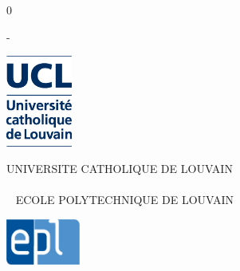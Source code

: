\documentclass[11pt,a4paper,oldfontcommands]{memoir}
\newcommand\draft{0}
\begin{document}
%
%
\draft


\thispagestyle{empty}

\calccentering{\unitlength}
\begin{adjustwidth*}{\unitlength}{-\unitlength}
\noindent\begin{minipage}{.25\textwidth}
\begin{center}
\noindent\includegraphics[height=3cm]{images/ucl.eps}
\end{center}
\end{minipage}
\begin{minipage}{.49\textwidth}
\begin{center}
\begin{vplace}
UNIVERSITE CATHOLIQUE DE LOUVAIN
\\~\\~
ECOLE POLYTECHNIQUE DE LOUVAIN
\end{vplace}
\end{center}
\end{minipage}
\begin{minipage}{.25\textwidth}
\begin{center}
\begin{vplace}
\hfill\includegraphics[height=1.5cm]{images/epl.eps}
\end{vplace}
\end{center}
\end{minipage}
\end{adjustwidth*}
\end{document}
